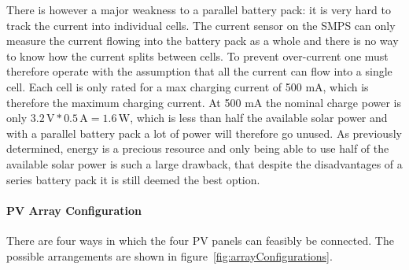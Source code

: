 \documentclass[a4paper]{article}
\newcommand{\unit}[1]{\ensuremath{\, \mathrm{#1}}}
\begin{document}
There is however a major weakness to a parallel battery pack: it is 
very hard to track the current into individual cells. The current 
sensor on the SMPS can only measure the current flowing into the 
battery pack as a whole and there is no way to know how the 
current splits between cells. To prevent over-current one must 
therefore operate with the assumption that all the current can 
flow into a single cell. Each cell is only rated for a max charging 
current of 500 mA\cite{batteryDatasheet}, which is therefore the 
maximum charging current. At 500 mA the nominal charge power is 
only \(3.2 \unit{V} * 0.5 \unit{A} = 1.6 \unit{W} \), which is 
less than half the available solar power and with a parallel 
battery pack a lot of power will therefore go unused. As 
previously determined, energy is a precious resource and only 
being able to use half of the available solar power is such a 
large drawback, that despite the disadvantages of a series battery 
pack it is still deemed the best option.

\paragraph*{PV Array Configuration}
There are four ways in which the four PV panels can feasibly be connected. 
The possible arrangements are shown in figure~\ref{fig:arrayConfigurations}.
\end{document}
